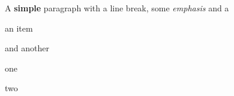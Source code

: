\subject{Give RedCloth a try!}

A {\bf simple} paragraph with\crlf
a line break, some
{\em emphasis} and a
\from[1]

\startitemize
\item
  an item
\item
  and another
\stopitemize

\startitemize[n]
\item
  one
\item
  two
\stopitemize
